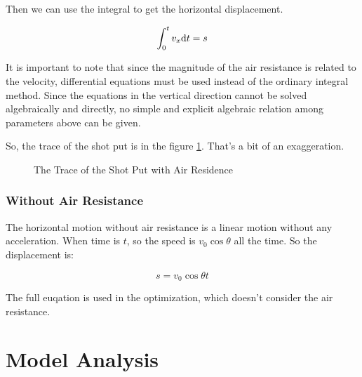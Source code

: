 \documentclass{article}
\begin{document}
Then we can use the integral to get the horizontal displacement.

\begin{equation}
    \int^t_0v_x\mathrm{d} t=s
\end{equation}

It is important to note that since the magnitude of the air resistance is related to the velocity, differential equations must be used instead of the ordinary integral method. Since the equations in the vertical direction cannot be solved algebraically and directly, no simple and explicit algebraic relation among parameters above can be given.

So, the trace of the shot put is in the figure \ref{fig:trace-with-residence}. That's a bit of an exaggeration.

\begin{figure}[H]
    \centering
    \caption{The Trace of the Shot Put with Air Residence}
    \label{fig:trace-with-residence}
\end{figure}

\subsubsection{Without Air Resistance}

The horizontal motion without air resistance is a linear motion without any acceleration. When time is $t$, so the speed is $v_0\cos\theta$ all the time. So the displacement is:

\begin{equation}
    s=v_0\cos\theta t
\end{equation}

The full euqation is used in the optimization, which doesn't consider the air resistance.

\section{Model Analysis}
\end{document}
